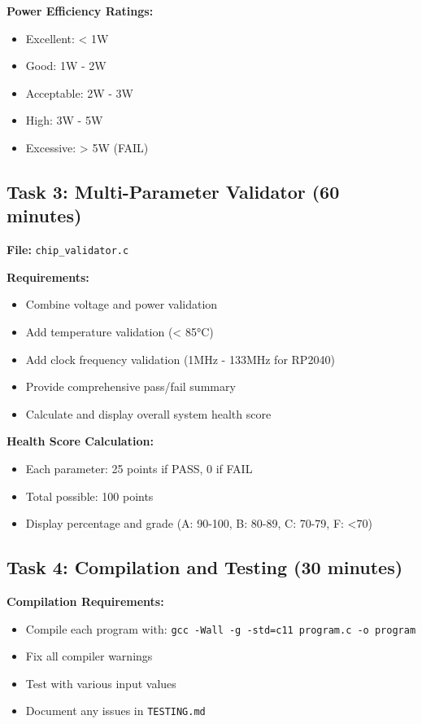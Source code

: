 \documentclass[11pt,a4paper]{article}
\begin{document}
\textbf{Power Efficiency Ratings:}
\begin{itemize}
    \item Excellent: < 1W
    \item Good: 1W - 2W
    \item Acceptable: 2W - 3W
    \item High: 3W - 5W
    \item Excessive: > 5W (FAIL)
\end{itemize}

\subsection{Task 3: Multi-Parameter Validator (60 minutes)}

\textbf{File:} \texttt{chip\_validator.c}

\textbf{Requirements:}
\begin{itemize}
    \item Combine voltage and power validation
    \item Add temperature validation (< 85°C)
    \item Add clock frequency validation (1MHz - 133MHz for RP2040)
    \item Provide comprehensive pass/fail summary
    \item Calculate and display overall system health score
\end{itemize}

\textbf{Health Score Calculation:}
\begin{itemize}
    \item Each parameter: 25 points if PASS, 0 if FAIL
    \item Total possible: 100 points
    \item Display percentage and grade (A: 90-100, B: 80-89, C: 70-79, F: <70)
\end{itemize}

\subsection{Task 4: Compilation and Testing (30 minutes)}

\textbf{Compilation Requirements:}
\begin{itemize}
    \item Compile each program with: \texttt{gcc -Wall -g -std=c11 program.c -o program}
    \item Fix all compiler warnings
    \item Test with various input values
    \item Document any issues in \texttt{TESTING.md}
\end{itemize}
\end{document}
